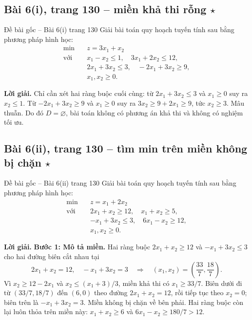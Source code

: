 \documentclass[11pt,a4paper]{article}
\begin{document}
\subsection{Bài 6(i), trang 130 -- miền khả thi rỗng \(\star\)}
\begin{questionbox}{Đề bài gốc -- Bài 6(i) trang 130}
Giải bài toán quy hoạch tuyến tính sau bằng phương pháp hình học:
\[
\begin{aligned}
\min\quad &z=3x_1+x_2\\
\text{với }&x_1-x_2\le1,\quad 3x_1+2x_2\le12,\\
&2x_1+3x_2\le3,\quad -2x_1+3x_2\ge9,\\
&x_1,x_2\ge0.
\end{aligned}
\]
\end{questionbox}
\textbf{Lời giải.}
Chỉ cần xét hai ràng buộc cuối cùng: từ \(2x_1+3x_2\le3\) và \(x_1\ge0\) suy ra \(x_2\le1\). Từ \(-2x_1+3x_2\ge9\) và \(x_1\ge0\) suy ra \(3x_2\ge9+2x_1\ge9\), tức \(x_2\ge3\). Mâu thuẫn. Do đó \(D=\varnothing\), bài toán không có phương án khả thi và không có nghiệm tối ưu.

\clearpage
\subsection{Bài 6(ii), trang 130 -- tìm min trên miền không bị chặn \(\star\)}
\begin{questionbox}{Đề bài gốc -- Bài 6(ii) trang 130}
Giải bài toán quy hoạch tuyến tính sau bằng phương pháp hình học:
\[
\begin{aligned}
\min\quad &z=x_1+2x_2\\
\text{với }&2x_1+x_2\ge12,\quad x_1+x_2\ge5,\\
&-x_1+3x_2\le3,\quad 6x_1-x_2\ge12,\\
&x_1,x_2\ge0.
\end{aligned}
\]
\end{questionbox}
\textbf{Lời giải.}
\textbf{Bước 1: Mô tả miền.} Hai ràng buộc \(2x_1+x_2\ge12\) và \(-x_1+3x_2\le3\) cho hai đường biên cắt nhau tại
\[
2x_1+x_2=12,\quad -x_1+3x_2=3
\quad\Longrightarrow\quad
(x_1,x_2)=\left(\frac{33}{7},\frac{18}{7}\right).
\]
Vì \(x_2\ge12-2x_1\) và \(x_2\le(x_1+3)/3\), miền khả thi có \(x_1\ge33/7\). Biên dưới đi từ \((33/7,18/7)\) đến \((6,0)\) theo đường \(2x_1+x_2=12\), rồi tiếp tục theo \(x_2=0\); biên trên là \(-x_1+3x_2=3\). Miền không bị chặn về bên phải. Hai ràng buộc còn lại luôn thỏa trên miền này: \(x_1+x_2\ge6\) và \(6x_1-x_2\ge180/7>12\).
\end{document}
